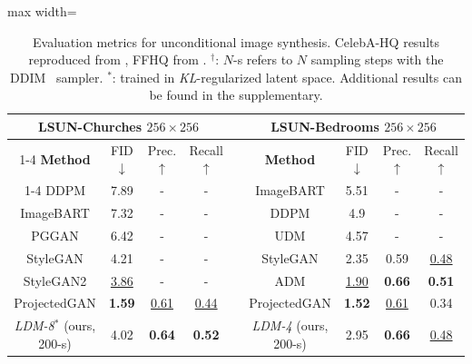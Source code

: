 \begin{table}[t]
\begin{footnotesize}
  \begin{adjustbox}{max width=\linewidth}
  \begin{tabular}{c c c c c c c c c}
    \toprule
    \multicolumn{4}{c}{LSUN-Churches $256\times 256$} & & \multicolumn{4}{c}{LSUN-Bedrooms $256\times 256$} \\
    \cmidrule{1-4} \cmidrule{6-9}
    \textbf{Method} & FID $\downarrow$& Prec. $\uparrow$ & Recall $\uparrow$  & & \textbf{Method} & FID $\downarrow$& Prec. $\uparrow$ & Recall $\uparrow$  \\
    \cmidrule{1-4} \cmidrule{6-9}
	DDPM \cite{DBLP:conf/nips/HoJA20} & 7.89 & - & - & &ImageBART \cite{DBLP:journals/corr/abs-2108-08827} & 5.51 & -&- \\
    ImageBART\cite{DBLP:journals/corr/abs-2108-08827} & 7.32 & - & - & &  DDPM \cite{DBLP:conf/nips/HoJA20} &4.9 &- &- \\
    PGGAN \cite{DBLP:journals/corr/abs-1710-10196} & 6.42 & - & - & & UDM \cite{DBLP:journals/corr/abs-2106-05527} & 4.57 & -&-\\
    StyleGAN\cite{stylegan} & 4.21 & - & - & &  StyleGAN\cite{stylegan} & 2.35 & 0.59 &  \underline{0.48} \\
    StyleGAN2\cite{DBLP:journals/corr/abs-1912-04958} & \underline{3.86} & - & - &  & ADM \cite{DBLP:journals/corr/abs-2105-05233} & \underline{1.90} & \textbf{0.66} & \textbf{0.51} \\
    ProjectedGAN\cite{DBLP:journals/corr/abs-2111-01007} & \textbf{1.59} & \underline{0.61} & \underline{0.44} & & ProjectedGAN\cite{DBLP:journals/corr/abs-2111-01007} & \textbf{1.52} & \underline{0.61} & 0.34\\
    \midrule
    \emph{LDM-8}$^*$ (ours, 200-s) & 4.02 & \textbf{0.64} & \textbf{0.52} & & \emph{LDM-4} (ours, 200-s) & 2.95 & \textbf{0.66} & \underline{0.48} \\
    \bottomrule
  \end{tabular}
  \end{adjustbox}
\end{footnotesize}
  \caption{\label{tab:fids} Evaluation metrics for unconditional image
  synthesis. CelebA-HQ results reproduced from
  \cite{DBLP:conf/cvpr/ParmarLLT21,DBLP:conf/iclr/XiaoKKV21,DBLP:journals/corr/abs-2106-05527},
  FFHQ from
  \cite{DBLP:journals/corr/abs-1912-04958,DBLP:journals/corr/abs-2106-05527}. $^\dagger$: $N$-s refers to $N$ sampling steps with the DDIM~\cite{DBLP:conf/iclr/SongME21} sampler. $^*$: trained in \emph{KL}-regularized latent space.
  Additional results can be found in the supplementary.}
\end{table}

